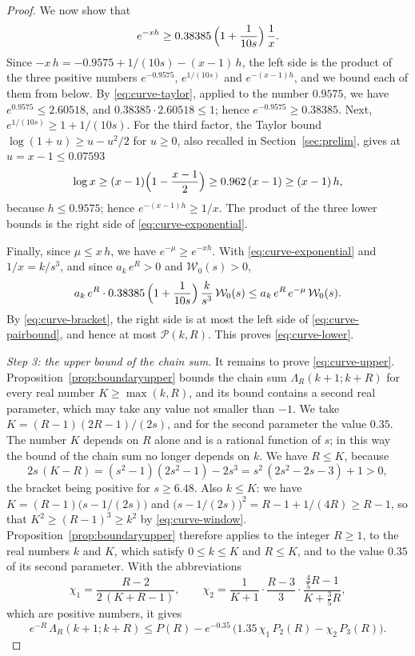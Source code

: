 \documentclass{amsart}
\theoremstyle{definition}
\theoremstyle{remark}
\numberwithin{equation}{section}
\begin{document}
\begin{proof}
We now show that
\begin{equation}\label{eq:curve-exponential}
e^{-xh}\ge0.38385\,\Bigl(1+\frac{1}{10s}\Bigr)\,\frac1x .
\end{equation}
Since $-x\,h=-0.9575+1/(10s)-(x-1)\,h$, the left side is the product
of the three positive numbers $e^{-0.9575}$, $e^{1/(10s)}$ and
$e^{-(x-1)h}$, and we bound each of them from below. By
\eqref{eq:curve-taylor}, applied to the number $0.9575$, we have
$e^{0.9575}\le2.60518$, and $0.38385\cdot2.60518\le1$; hence
$e^{-0.9575}\ge0.38385$. Next, $e^{1/(10s)}\ge1+1/(10s)$. For the third
factor, the Taylor bound $\log(1+u)\ge u-u^2/2$ for $u\ge0$, also recalled
in Section~\ref{sec:prelim}, gives at $u=x-1\le0.07593$
\[
\log x\ge(x-1)\Bigl(1-\frac{x-1}{2}\Bigr)\ge0.962\,(x-1)\ge(x-1)\,h,
\]
because $h\le0.9575$; hence $e^{-(x-1)h}\ge1/x$. The product of the
three lower bounds is the right side of \eqref{eq:curve-exponential}.

Finally, since $\mu\le x\,h$, we have $e^{-\mu}\ge e^{-xh}$. With
\eqref{eq:curve-exponential} and $1/x=k/s^3$, and since $a_k\,e^{R}>0$ and
$\mathcal W_0(s)>0$,
\[
a_k\,e^{R}\cdot0.38385\,\Bigl(1+\frac{1}{10s}\Bigr)\,\frac{k}{s^3}\,
\mathcal W_0(s)
\le a_k\,e^{R}\,e^{-\mu}\,\mathcal W_0(s) .
\]
By \eqref{eq:curve-bracket}, the right side is at most the left side of
\eqref{eq:curve-pairbound}, and hence at most $\mathcal P(k,R)$. This
proves \eqref{eq:curve-lower}.

\emph{Step 3: the upper bound of the chain sum.}
It remains to prove \eqref{eq:curve-upper}.
Proposition~\ref{prop:boundaryupper} bounds the chain sum
$\Lambda_R(k+1;k+R)$ for every real number $K\ge\max(k,R)$, and its bound
contains a second real parameter, which may take any value not smaller than
$-1$. We take $K=(R-1)(2R-1)/(2s)$, and for the second parameter the value
$0.35$. The number $K$ depends on $R$ alone and is a rational function of
$s$; in this way the bound of the chain sum no longer depends on $k$.
We have $R\le K$, because
\[
2s\,(K-R)=(s^2-1)(2s^2-1)-2s^3=s^2\,(2s^2-2s-3)+1>0 ,
\]
the bracket being positive for $s\ge6.48$. Also $k\le K$: we have
$K=(R-1)\bigl(s-1/(2s)\bigr)$ and
$\bigl(s-1/(2s)\bigr)^2=R-1+1/(4R)\ge R-1$, so that
$K^2\ge(R-1)^3\ge k^2$ by \eqref{eq:curve-window}.
Proposition~\ref{prop:boundaryupper} therefore applies to the integer
$R\ge1$, to the real numbers $k$ and $K$, which satisfy $0\le k\le K$ and
$R\le K$, and to the value $0.35$ of its second parameter. With the
abbreviations
\[
\chi_1=\frac{R-2}{2\,(K+R-1)},\qquad
\chi_2=\frac{1}{K+1}\cdot\frac{R-3}{3}\cdot\frac{\frac45R-1}{K+\frac35R},
\]
which are positive numbers, it gives
\begin{equation}\label{eq:curve-chain}
e^{-R}\,\Lambda_R(k+1;k+R)\le P(R)-e^{-0.35}\,
\bigl(1.35\,\chi_1\,P_2(R)-\chi_2\,P_3(R)\bigr).
\end{equation}


\end{proof}
\end{document}

